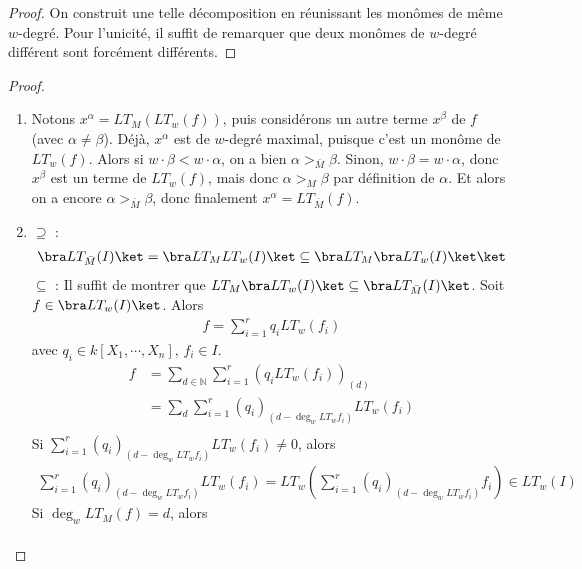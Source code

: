         \begin{proof}
            On construit une telle décomposition en réunissant les monômes de même $w$-degré. Pour l'unicité, il suffit de remarquer que deux monômes de $w$-degré différent sont forcément différents.
        \end{proof}
        \begin{proof}
            \begin{enumerate}
                \item Notons $x^\alpha = LT_M(LT_w(f))$, puis considérons un autre terme $x^\beta$ de $f$ (avec $\alpha \neq \beta$). Déjà, $x^\alpha$ est de $w$-degré maximal, puisque c'est un monôme de $LT_w(f)$. Alors si $w \cdot \beta < w \cdot \alpha$, on a bien $\alpha >_{\bar M} \beta$. Sinon, $w \cdot \beta = w \cdot \alpha$, donc $x^\beta$ est un terme de $LT_w(f)$, mais donc $\alpha >_M \beta$ par définition de $\alpha$. Et alors on a encore $\alpha >_{\bar M} \beta$, donc finalement $x^\alpha = LT_{\bar M}(f)$.
                \item $\supseteq$ : 
                \begin{align*}
                    \bra LT_{\bar M}(I) \ket = \bra LT_M LT_w(I) \ket \subseteq \bra LT_M \bra LT_w(I) \ket \ket 
                \end{align*}
                $\subseteq$ : Il suffit de montrer que $LT_M \bra LT_w(I) \ket \subseteq \bra LT_{\bar M}(I) \ket$. Soit $f \in \bra LT_w(I) \ket$. Alors 
                \begin{align*}
                    f = \sum_{i = 1}^r q_i LT_w(f_i)
                \end{align*}
                avec $q_i \in k[X_1, \cdots, X_n]$, $f_i \in I$.
                \begin{align*}
                    f &= \sum_{d \in \mathbb{N}} \sum_{i = 1}^r (q_i LT_w(f_i))_{(d)} \\
                    &= \sum_d \sum_{i = 1}^r (q_i)_{(d - \deg_w LT_w f_i)} LT_w(f_i) \\
                \end{align*}
                Si $\sum_{i = 1}^r (q_i)_{(d - \deg_w LT_w f_i)} LT_w(f_i) \neq 0$, alors
                \begin{align*}
                    \sum_{i = 1}^r (q_i)_{(d - \deg_w LT_w f_i)} LT_w(f_i) = LT_w \left( \sum_{i = 1}^r (q_i)_{(d - \deg_w LT_w f_i)} f_i \right) \in LT_w(I) 
                \end{align*}
                Si $\deg_w LT_M(f) = d$, alors
                \begin{align*}

\end{align*}
\end{enumerate}
\end{proof}
